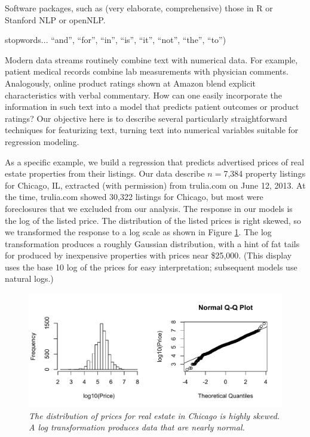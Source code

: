 \documentclass[12pt]{article}
\begin{document}
 
 Software packages, such as (very elaborate, comprehensive) those in R
 \citep[tm][]{feinerer08} or Stanford NLP or openNLP.

 stopwords... ``and'', ``for'', ``in'', ``is'', ``it'', ``not'', ``the'', ``to'')
 
 
 \clearpage


 Modern data streams routinely combine text with numerical data.  For example, patient medical records combine lab
 measurements with physician comments.  Analogously, online product ratings
 shown at Amazon blend explicit characteristics with verbal commentary.  How can
 one easily incorporate the information in such text into a model
 that predicts patient outcomes or product ratings?  Our objective here is to
 describe several particularly straightforward techniques for featurizing
 text, turning text into numerical variables suitable for regression modeling.
 
 
 As a specific example, we build a regression that predicts advertised prices
 of real estate properties from their listings.  Our data describe $n=$7,384
 property listings for Chicago, IL, extracted (with permission) from trulia.com
 on June 12, 2013.  At the time, trulia.com showed 30,322 listings for Chicago,
 but most were foreclosures that we excluded from our analysis.  The response in
 our models is the log of the listed price.  The distribution of the listed
 prices is right skewed, so we transformed the response to a log scale as shown
 in Figure \ref{fig:prices}.  The log transformation produces a roughly Gaussian
 distribution, with a hint of fat tails for produced by inexpensive properties
 with prices near \$25,000.  (This display uses the base 10 log of the prices
 for easy interpretation; subsequent models use natural logs.)
 
 
 \begin{figure}
 \caption{ \label{fig:prices} { \sl The distribution of prices for real estate
 in Chicago is highly skewed.  A log transformation produces data that are
 nearly normal.}  }
 \centerline{
 \vspace{0.1in}
 \includegraphics[width=5in]{figures/prices} }
 \vspace{0.2in}
 \end{figure}
\end{document}
